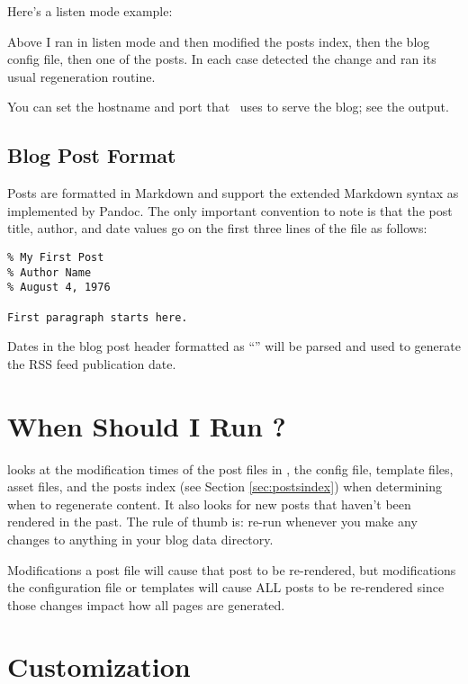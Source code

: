 \documentclass[11pt, letterpaper, oneside, titlepage]{book}
\begin{document}
Here's a listen mode example:


Above I ran  in listen mode and then modified the posts index,
then the blog config file, then one of the posts.  In each case
 detected the change and ran its usual regeneration routine.

You can set the hostname and port that \mathblog\ uses to serve the
blog; see the  output.

\subsection{Blog Post Format}

Posts are formatted in Markdown and support the extended Markdown
syntax as implemented by Pandoc.  The only important convention to
note is that the post title, author, and date values go on the first
three lines of the file as follows:

\begin{verbatim}
% My First Post
% Author Name
% August 4, 1976

First paragraph starts here.
\end{verbatim}

Dates in the blog post header formatted as ``'' will be parsed and used to generate the RSS feed
publication date.

\section{When Should I Run ?}

 looks at the modification times of the post files in
, the config file, template files, asset files, and the
posts index (see Section \ref{sec:postsindex}) when determining when
to regenerate content.  It also looks for new posts that haven't been
rendered in the past.  The rule of thumb is: re-run  whenever
you make any changes to anything in your blog data directory.

Modifications a post file will cause that post to be re-rendered, but
modifications the configuration file or templates will cause ALL posts
to be re-rendered since those changes impact how all pages are
generated.

\section{Customization}
\label{sec:customizing}
\end{document}
